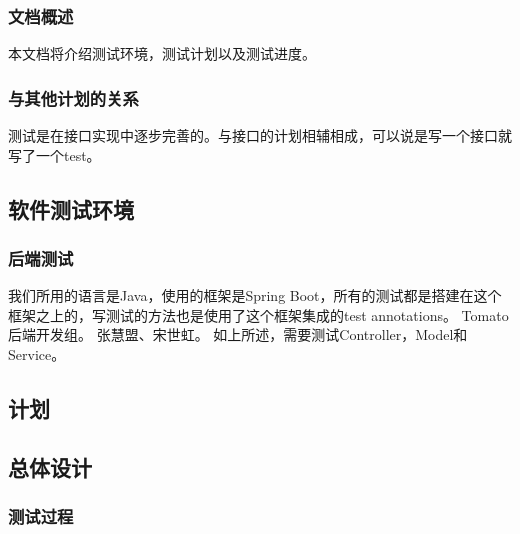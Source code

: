 \documentclass[12pt, a4paper,UTF8]{article}
\begin{document}
			\subsubsection{文档概述}
				本文档将介绍测试环境，测试计划以及测试进度。
			\subsubsection{与其他计划的关系}
				测试是在接口实现中逐步完善的。与接口的计划相辅相成，可以说是写一个接口就写了一个test。
		\subsection{软件测试环境}
			\subsubsection{后端测试}
					我们所用的语言是Java，使用的框架是Spring Boot，所有的测试都是搭建在这个框架之上的，写测试的方法也是使用了这个框架集成的test annotations。
					Tomato后端开发组。
					张慧盟、宋世虹。
					如上所述，需要测试Controller，Model和Service。
		\subsection{计划}
			\subsection{总体设计}
				\subsubsection{测试过程}
\end{document}
